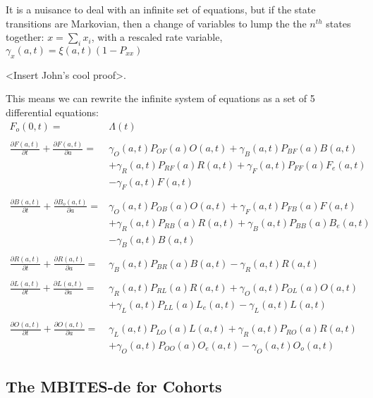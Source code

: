 \documentclass{article}
\begin{document}
It is a nuisance to deal with an infinite set of equations, but
if the state transitions are Markovian, then a change of
variables to lump the the $n^{th}$ states together: $x = \sum_i
x_i$, with a rescaled rate variable, $\gamma_x(a,t) =
\xi(a,t) (1-P_{xx})$   

<Insert John's cool proof>.  

This means we can rewrite the infinite system of equations as a
set of 5 differential equations: 
%
\begin{equation}\begin{array}{rl}
F_o(0,t) =& \Lambda(t) \\ 
%
&\\
\frac{\partial F(a,t)}{\partial t} + \frac{\partial F(a,t)}{\partial a} =& 
\gamma_O(a,t) P_{OF}(a) O(a,t) 
+ \gamma_B(a,t) P_{BF}(a) B(a,t) \\&
 + \gamma_R(a,t) P_{RF}(a) R(a,t)
+ \gamma_F(a,t) P_{FF}(a) F_e(a,t) \\ &
- \gamma_F(a,t) F(a,t) \\ 
%
%
&\\
\frac{\partial B(a,t)}{\partial t} + \frac{\partial B_o(a,t)}{\partial a} =&  \gamma_O(a,t) P_{OB}(a) O(a,t) + \gamma_F(a,t) P_{FB}(a) F(a,t) \\ & 
+ \gamma_R(a,t) P_{RB}(a) R(a,t) 
+ \gamma_B(a,t) P_{BB}(a) B_e(a,t)\\ & 
- \gamma_B(a,t) B(a,t) \\ 
%
&\\
\frac{\partial R(a,t)}{\partial t} + \frac{\partial R(a,t)}{\partial a} =&  \gamma_B(a,t) P_{BR}(a) B(a,t) - \gamma_R(a,t) R(a,t)\\ 
%
&\\
\frac{\partial L(a,t)}{\partial t} + \frac{\partial L(a,t)}{\partial a} =& \gamma_R(a,t) P_{RL}(a) R(a,t) + 
\gamma_O(a,t) P_{OL}(a) O(a,t) \\&
+ \gamma_L(a,t)  P_{LL}(a) L_e(a,t)
- \gamma_L(a,t)   L(a,t)
\\ 
%
&\\
\frac{\partial O(a,t)}{\partial t} + \frac{\partial O(a,t)}{\partial a} =& \gamma_L(a,t) P_{LO}(a) L(a,t) 
+ \gamma_R(a,t) P_{RO}(a) R(a,t)  
\\&
+ \gamma_O(a,t) P_{OO}(a) O_e(a,t)
- \gamma_O(a,t)  O_o(a,t)

%
\end{array}\end{equation}


\subsection{The MBITES-de for Cohorts}
\end{document}
